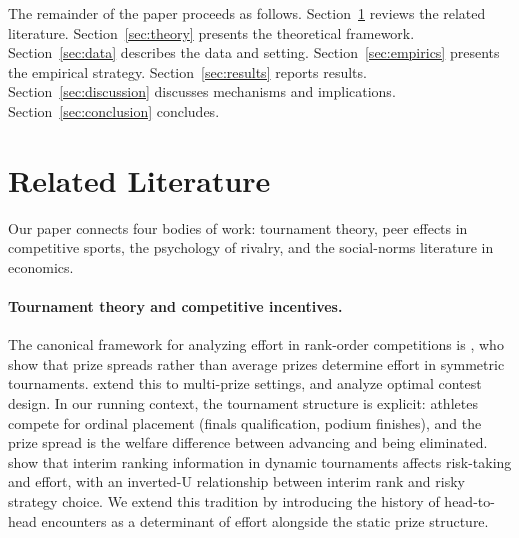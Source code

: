 \documentclass[12pt]{article}
\theoremstyle{definition}
\theoremstyle{remark}
\begin{document}
The remainder of the paper proceeds as follows.
Section~\ref{sec:literature} reviews the related literature.
Section~\ref{sec:theory} presents the theoretical framework.
Section~\ref{sec:data} describes the data and setting.
Section~\ref{sec:empirics} presents the empirical strategy.
Section~\ref{sec:results} reports results.
Section~\ref{sec:discussion} discusses mechanisms and implications.
Section~\ref{sec:conclusion} concludes.

\section{Related Literature}
\label{sec:literature}

Our paper connects four bodies of work: tournament theory, peer effects in
competitive sports, the psychology of rivalry, and the social-norms literature
in economics.

\paragraph{Tournament theory and competitive incentives.}
The canonical framework for analyzing effort in rank-order competitions is
\citet{LazearRosen1981}, who show that prize spreads rather than average prizes
determine effort in symmetric tournaments.
\citet{GreenStokey1983} extend this to multi-prize settings, and
\citet{NalebuffStiglitz1983} analyze optimal contest design.
In our running context, the tournament structure is explicit: athletes compete
for ordinal placement (finals qualification, podium finishes), and the prize
spread is the welfare difference between advancing and being eliminated.
\citet{GenakosPageliero2012} show that interim ranking information in dynamic
tournaments affects risk-taking and effort, with an inverted-U relationship
between interim rank and risky strategy choice.
We extend this tradition by introducing the history of head-to-head encounters
as a determinant of effort alongside the static prize structure.
\end{document}
